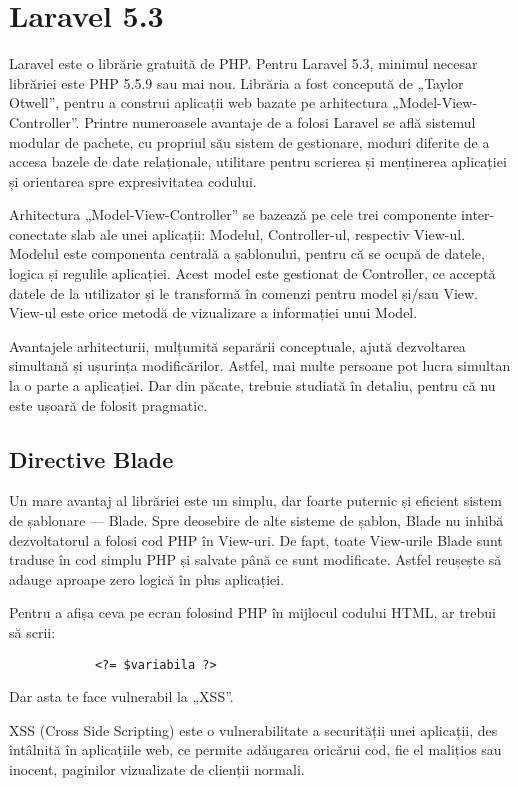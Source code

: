 \section{Laravel 5.3}

	Laravel este o librărie gratuită de PHP.
	Pentru Laravel 5.3, minimul necesar librăriei este PHP 5.5.9 sau mai nou.
	Librăria a fost concepută de „Taylor Otwell”, pentru a construi aplicații web bazate pe arhitectura „Model-View-Controller”.
	Printre numeroasele avantaje de a folosi Laravel se află sistemul modular de pachete, cu propriul său sistem de gestionare, moduri diferite de a accesa bazele de date relaționale, utilitare pentru scrierea și menținerea aplicației și orientarea spre expresivitatea codului.\cite{laravel_book}

	Arhitectura „Model-View-Controller” se bazează pe cele trei componente inter-conectate slab ale unei aplicații: Modelul, Controller-ul, respectiv View-ul.
	Modelul este componenta centrală a șablonului, pentru că se ocupă de datele, logica și regulile aplicației.
	Acest model este gestionat de Controller, ce acceptă datele de la utilizator și le transformă în comenzi pentru model și/sau View.
	View-ul este orice metodă de vizualizare a informației unui Model.\cite{poo_sa}

	Avantajele arhitecturii, mulțumită separării conceptuale, ajută dezvoltarea simultană și ușurința modificărilor.
	Astfel, mai multe persoane pot lucra simultan la o parte a aplicației.
	Dar din păcate, trebuie studiată în detaliu, pentru că nu este ușoară de folosit pragmatic.

	\subsection{Directive Blade}
		Un mare avantaj al librăriei este un simplu, dar foarte puternic și eficient sistem de șablonare --- Blade.
		Spre deosebire de alte sisteme de șablon, Blade nu inhibă dezvoltatorul a folosi cod PHP în View-uri.
		De fapt, toate View-urile Blade sunt traduse în cod simplu PHP și salvate până ce sunt modificate.
		Astfel reușește să adauge aproape zero logică în plus aplicației.

		Pentru a afișa ceva pe ecran folosind PHP în mijlocul codului HTML, ar trebui să scrii:
			\begin{Verbatim}
			<?= $variabila ?>
			\end{Verbatim}
		Dar asta te face vulnerabil la „XSS”.

		XSS (Cross Side Scripting) este o vulnerabilitate a securității unei aplicații, des întâlnită în aplicațiile web, ce permite adăugarea oricărui cod, fie el malițios sau inocent, paginilor vizualizate de clienții normali.


